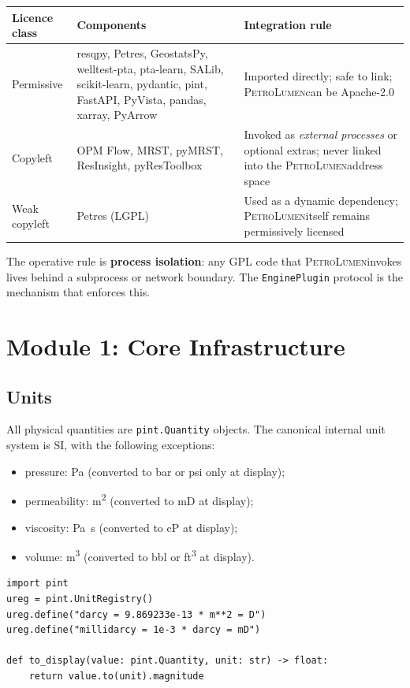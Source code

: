\documentclass[11pt,a4paper]{article}
\newcommand{\petro}{\textsc{PetroLumen}}
\newcommand{\code}[1]{\texttt{#1}}
\begin{document}
\begin{longtable}{@{}p{3.3cm}p{4.0cm}p{6.1cm}@{}}
\toprule
\textbf{Licence class} & \textbf{Components} & \textbf{Integration rule}\\
\midrule
\endhead
Permissive & resqpy, Petres, GeostatsPy, welltest-pta, pta-learn, SALib, scikit-learn, pydantic, pint, FastAPI, PyVista, pandas, xarray, PyArrow & Imported directly; safe to link; \petro can be Apache-2.0\\
\midrule
Copyleft & OPM Flow, MRST, pyMRST, ResInsight, pyResToolbox & Invoked as \emph{external processes} or optional extras; never linked into the \petro address space\\
\midrule
Weak copyleft & Petres (LGPL) & Used as a dynamic dependency; \petro itself remains permissively licensed\\
\bottomrule
\end{longtable}

\noindent The operative rule is \textbf{process isolation}: any GPL code that
\petro invokes lives behind a subprocess or network boundary. The
\code{EnginePlugin} protocol is the mechanism that enforces this.

\section{Module 1: Core Infrastructure}

\subsection{Units}
All physical quantities are \code{pint.Quantity} objects. The canonical internal
unit system is SI, with the following exceptions:
\begin{itemize}[leftmargin=1.4em]
  \item pressure: \si{Pa} (converted to \si{bar} or \si{psi} only at display);
  \item permeability: \si{m^2} (converted to \si{mD} at display);
  \item viscosity: \si{Pa.s} (converted to \si{cP} at display);
  \item volume: \si{m^3} (converted to \si{bbl} or \si{ft^3} at display).
\end{itemize}

\begin{lstlisting}[caption={Unit helper module.}]
import pint
ureg = pint.UnitRegistry()
ureg.define("darcy = 9.869233e-13 * m**2 = D")
ureg.define("millidarcy = 1e-3 * darcy = mD")

def to_display(value: pint.Quantity, unit: str) -> float:
    return value.to(unit).magnitude
\end{lstlisting}
\end{document}
